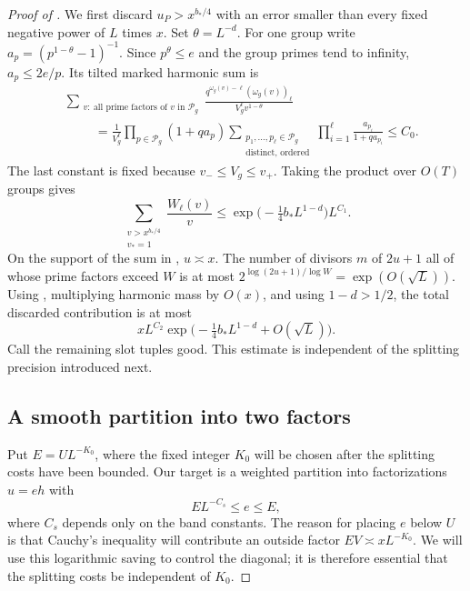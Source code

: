\begin{proof}[Proof of ]
We first discard $u_P>x^{b_*/4}$ with an error smaller than every fixed
negative power of $L$ times $x$. Set $\theta=L^{-d}$. For one group write
$a_p=(p^{1-\theta}-1)^{-1}$. Since $p^\theta\leq e$ and the group primes
tend to infinity, $a_p\leq 2e/p$. Its tilted marked harmonic sum is
\begin{align*}
 &\sum_{\substack{v:\ \text{all prime factors of }v\text{ in }\mathcal P_g}}
 \frac{q^{\omega_g(v)-\ell}(\omega_g(v))_\ell}
      {V_g^\ell v^{1-\theta}}\\
 &\hspace{1cm}=
 \frac1{V_g^\ell}\prod_{p\in\mathcal P_g}(1+qa_p)
 \sum_{\substack{p_1,\ldots,p_\ell\in\mathcal P_g\\
                         \text{distinct, ordered}}}
       \prod_{i=1}^{\ell}\frac{a_{p_i}}{1+qa_{p_i}}
 \leq C_0.
\end{align*}
The last constant is fixed because $v_-\leq V_g\leq v_+$.
Taking the product over $O(T)$ groups gives
\begin{equation}\label{eq:typeii-P-tail}
 \sum_{\substack{v>x^{b_*/4}\\v_*=1}}\frac{W_\ell(v)}v
       \leq \exp\bigl(-\tfrac14 b_*L^{1-d}\bigr)L^{C_1}.
\end{equation}
On the support of the sum in , $u\asymp x$.
The number of divisors $m$ of $2u+1$ all of whose prime factors exceed
$W$ is at most $2^{\log(2u+1)/\log W}=\exp(O(\sqrt L))$.
Using , multiplying
harmonic mass by $O(x)$, and using $1-d>1/2$, the total discarded
contribution is at most
\[
 xL^{C_2}\exp\bigl(-\tfrac14 b_*L^{1-d}+O(\sqrt L)\bigr).
\]
Call the remaining slot tuples good. This estimate is independent of
the splitting precision introduced next.

\subsection{A smooth partition into two factors}

Put $E=UL^{-K_0}$, where the fixed integer $K_0$ will be chosen
after the splitting costs have been bounded. Our target is a weighted
partition into factorizations $u=eh$ with
\begin{equation}\label{eq:typeii-e-range}
                 EL^{-C_s}\leq e\leq E,
\end{equation}
where $C_s$ depends only on the band constants. The reason for placing
$e$ below $U$ is that Cauchy's inequality will contribute an outside
factor $EV\asymp xL^{-K_0}$. We will use this logarithmic saving to
control the diagonal; it is therefore essential that the splitting
costs be independent of $K_0$.


\end{proof}
